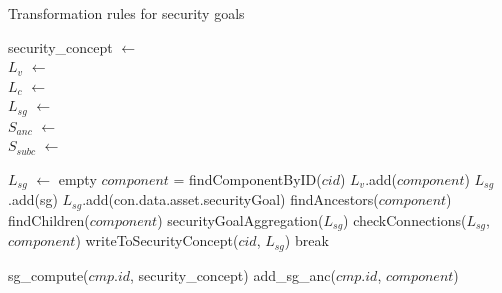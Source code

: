 \begin{algorithm}[H]
\caption{Transformation rules for security goals}
security\_concept $\gets$  \\
$L_v$ $\gets$  \\
$L_c$ $\gets$  \\
$L_{sg}$ $\gets$  \\
$S_{anc}$ $\gets$  \\
$S_{subc}$ $\gets$  \\

\begin{algorithmic}[1]

\State $L_{sg}$ $\gets$ empty
\State $component$ = findComponentByID($cid$)
\State $L_v$.add($component$)
	\State $L_{sg}$.add(sg)	
\EndFor
{}
\State $L_{sg}$.add(con.data.asset.securityGoal)
\EndFor
\State findAncestors($component$) 
\State findChildren($component$) 
\State securityGoalAggregation({$L_{sg}$})
\State checkConnections($L_{sg}$, $component$)
\State writeToSecurityConcept($cid$, $L_{sg}$) 
\Else
\State break
\EndIf
\EndFunction

\EndIf
\Else
{}
\State sg\_compute($cmp.id$, security\_concept)
\State add\_sg\_anc($cmp.id$, $component$)
\EndFor
\EndIf

\EndFunction
{} 

\end{algorithmic}
\end{algorithm}

